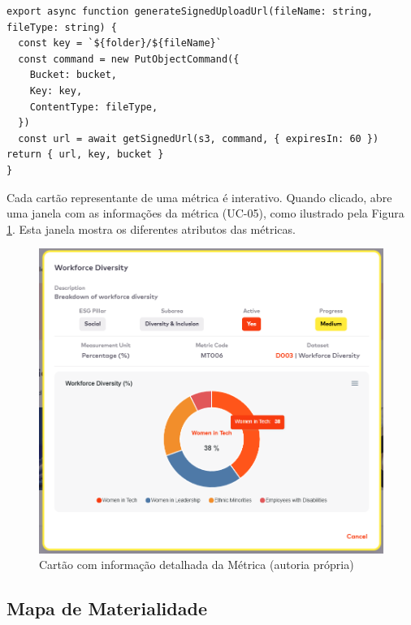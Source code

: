 \newpage

\begin{lstlisting}[style=customts, caption={Função de \textit{Upload} de uma imagem para o AWS S3}, label={lst:image_upload}]
export async function generateSignedUploadUrl(fileName: string, fileType: string) {
  const key = `${folder}/${fileName}`
  const command = new PutObjectCommand({
    Bucket: bucket,
    Key: key,
    ContentType: fileType,
  })
  const url = await getSignedUrl(s3, command, { expiresIn: 60 })
return { url, key, bucket }
}
\end{lstlisting}

Cada cartão representante de uma métrica é interativo. Quando clicado, abre uma janela com as informações da métrica (UC-05), como ilustrado pela Figura \ref{fig:metric_info}. Esta janela mostra os diferentes atributos das métricas.

\begin{figure}[H]
    \centering
    \includegraphics[width=5.5in,keepaspectratio]{frontmatter/assets/platform_prints/metrics/metric_info.png}
    \caption{Cartão com informação detalhada da Métrica (autoria própria)}
    \label{fig:metric_info}
\end{figure}

\subsection{Mapa de Materialidade}

